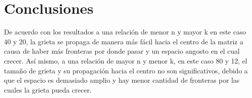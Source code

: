 \documentclass{article}
\begin{document}
\newpage

\section{Conclusiones}
De acuerdo con los resultados a una relación de menor n y mayor k en este caso 40 y 20, la grieta se propaga de manera más fácil hacia el centro de la matriz a causa de haber más fronteras por donde pasar y un espacio angosto en el cual crecer. Así mismo, a una relación de mayor n y menor k, en este caso 80 y 12, el tamaño de grieta y su propagación hacia el centro no son significativos, debido a que el espacio es demasiado amplio y hay menor cantidad de fronteras por las cuales la grieta pueda crecer.



\end{document}
